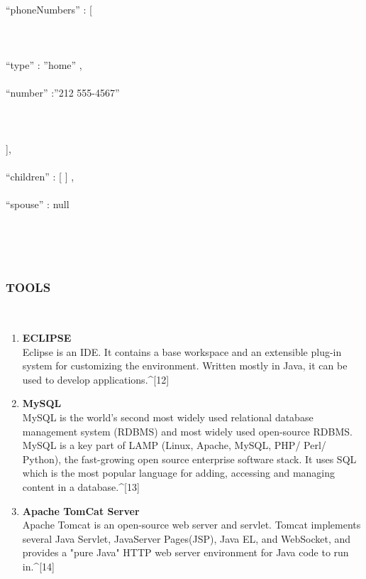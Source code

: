 \documentclass[12pt,a4paper]{article}
\begin{document}
\begin{enumerate}
{\\
\hspace{0.7 cm}		“phoneNumbers” : [\\
\\
\hspace{0.7 cm}		{\\
\\
\hspace{0.7 cm}			“type” : ”home” ,\\
\\
\hspace{0.7 cm}			“number” :”212 555-4567”\\
\\
\hspace{0.7 cm}		}\\
\\
\hspace{0.7 cm}		],\\
\\
\hspace{0.7 cm}		“children” : [ ] ,\\
\\
\hspace{0.7 cm}		“spouse” : null\\
\\
\hspace{0.7 cm}}\\

\end{enumerate}
\\
\subsubsection{TOOLS}
\\
\begin{enumerate}
\item \textbf{ECLIPSE}
\\
\hspace{0.7 cm}Eclipse is an IDE. It contains a base workspace and an extensible plug-in system for customizing the environment. Written mostly in Java, it can be used to develop applications.^{[12]}
\\
\item \textbf{MySQL}
\\
\hspace{0.7 cm} MySQL is the world's second most widely used relational database management system (RDBMS) and most widely used open-source RDBMS. MySQL is a key part of LAMP (Linux, Apache, MySQL, PHP/ Perl/ Python), the fast-growing open source enterprise software stack. It uses SQL which is the most popular language for adding, accessing and managing content in a database.^{[13]}
\\
\item \textbf{Apache TomCat Server}
\\
\hspace{0.7 cm} Apache Tomcat is an open-source web server and servlet. Tomcat implements several Java Servlet, JavaServer Pages(JSP), Java EL, and WebSocket, and provides a "pure Java" HTTP web server environment for Java code to run in.^{[14]}
\\
\end{enumerate}
\end{document}
